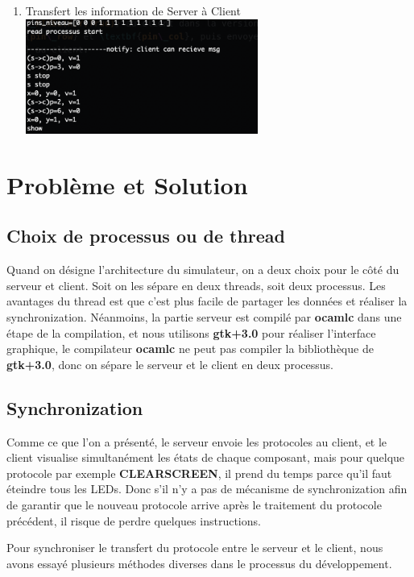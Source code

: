 \documentclass[14px]{article}
\begin{document}
\begin{enumerate}
	\item Transfert les information de Server à Client\\
	\centering
	\includegraphics[width=0.6\textwidth]{serverSend.png}\\[1cm]


\end{enumerate}
\clearpage

\section{Problème et Solution}
\subsection{Choix de processus ou de thread}
Quand on désigne l'architecture du simulateur, on a deux choix pour le côté du serveur et client. Soit on les sépare en deux threads, soit deux processus. Les avantages du thread est que c'est plus facile de partager les données et réaliser la synchronization. Néanmoins, la partie serveur est compilé par \textbf{ocamlc} dans une étape de la compilation, et nous utilisons \textbf{gtk+3.0} pour réaliser l'interface graphique, le compilateur \textbf{ocamlc} ne peut pas compiler la bibliothèque de \textbf{gtk+3.0}, donc on sépare le serveur et le client en deux processus.


\subsection{Synchronization}
Comme ce que l'on a présenté, le serveur envoie les protocoles au client, et le client visualise simultanément les états de chaque composant, mais pour quelque protocole par exemple \textbf{CLEARSCREEN}, il prend du temps parce qu'il faut éteindre tous les LEDs. Donc s'il n'y a pas de mécanisme de synchronization afin de garantir que le nouveau protocole arrive après le traitement du protocole précédent, il risque de perdre quelques instructions.

Pour synchroniser le transfert du protocole entre le serveur et le client, nous avons essayé plusieurs méthodes diverses dans le processus du développement.
\end{document}
